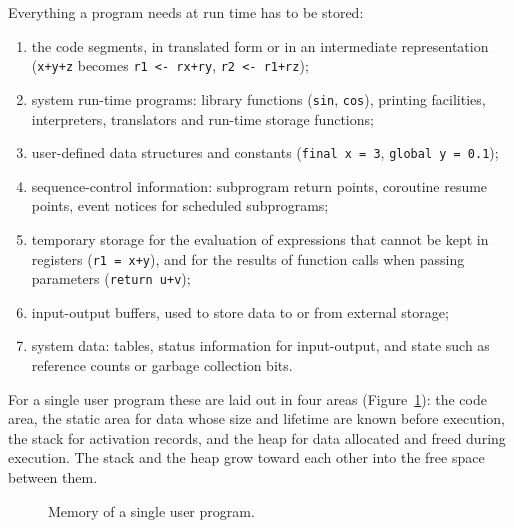 Everything a program needs at run time has to be stored:
\begin{enumerate}
  \item the code segments, in translated form or in an intermediate
    representation (\texttt{x+y+z} becomes \texttt{r1 <- rx+ry},
    \texttt{r2 <- r1+rz});
  \item system run-time programs: library functions (\texttt{sin},
    \texttt{cos}), printing facilities, interpreters, translators and run-time
    storage functions;
  \item user-defined data structures and constants
    (\texttt{final x = 3}, \texttt{global y = 0.1});
  \item sequence-control information: subprogram return points, coroutine
    resume points, event notices for scheduled subprograms;
  \item temporary storage for the evaluation of expressions that cannot be
    kept in registers (\texttt{r1 = x+y}), and for the results of function
    calls when passing parameters (\texttt{return u+v});
  \item input-output buffers, used to store data to or from external storage;
  \item system data: tables, status information for input-output, and state
    such as reference counts or garbage collection bits.
\end{enumerate}
For a single user program these are laid out in four areas
(Figure~\ref{fig:memory-map}): the code area, the static area for data whose
size and lifetime are known before execution, the stack for activation
records, and the heap for data allocated and freed during execution. The
stack and the heap grow toward each other into the free space between them.

\begin{figure}[h]
\centering
{}
\caption{Memory of a single user program.}
\label{fig:memory-map}
\end{figure}

